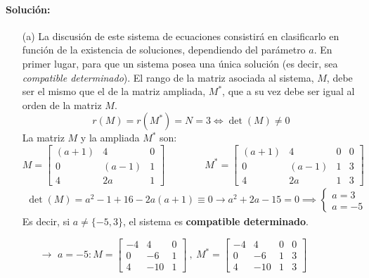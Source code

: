 \paragraph{Solución:}
\begin{enumerate}
    \item[(a)] La discusión de este sistema de ecuaciones consistirá en clasificarlo en función de la existencia de soluciones, dependiendo del parámetro $a$. En primer lugar, para que un sistema posea una única solución (es decir, sea \emph{compatible determinado}). El rango de la matriz asociada al sistema, $M$, debe ser el mismo que el de la matriz ampliada, $M^*$, que a su vez debe ser igual al orden de la matriz $M$.
    $$
    r(M)=r(M^*)=N=3\iff \det(M)\neq 0
    $$
    La matriz $M$ y la ampliada $M^*$ son:
    $$
    M=\left [ \begin{array}{ccc}
         (a+1) & 4     & 0  \\
          0    & (a-1) & 1  \\
          4    & 2a    & 1  
    \end{array} \right ] \qquad \qquad M^*=\left [ \begin{array}{ccc|c}
         (a+1) & 4     & 0 & 0\\
          0    & (a-1) & 1 & 3\\
          4    & 2a    & 1 & 3 
    \end{array} \right ] 
    $$
    \begin{equation*}
        \begin{split}
            \det(M)=a^2-1+16-2a(a+1)\equiv 0 \rightarrow a^2+2a-15=0 \implies \begin{cases}
                a=3\\a=-5
            \end{cases}
        \end{split}
    \end{equation*}
    Es decir, si $a\neq \{ -5,3\} $, el sistema es \textbf{compatible determinado}.
    \begin{enumerate}
        \item[$\rightarrow $]$a=-5: M=\left [ \begin{array}{ccc}
         -4 & 4     & 0  \\
          0    & -6 & 1  \\
          4    & -10    & 1  
    \end{array} \right ] \ , \ M^*=\left [ \begin{array}{ccc|c}
         -4 & 4     & 0  &0\\
          0    & -6 & 1  &3\\
          4    & -10    & 1 & 3
    \end{array} \right ]$ \\
    

\end{enumerate}
\end{enumerate}
